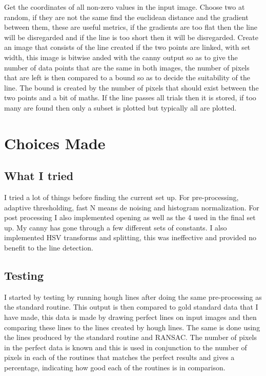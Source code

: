 \documentclass[paper=a4, fontsize=11pt]{scrartcl}
\numberwithin{equation}{section}		%
\numberwithin{figure}{section}			%
\numberwithin{table}{section}				%
\begin{document}
Get the coordinates of all non-zero values in the input image. Choose two at random, if they are not the same find the euclidean distance and the gradient between them, these are useful metrics, if the gradients are too flat then the line will be disregarded and if the line is too short then it will be disregarded. Create an image that consists of the line created if the two points are linked, with set width, this image is bitwise anded with the canny output so as to give the number of data points that are the same in both images, the number of pixels that are left is then compared to a bound so as to decide the suitability of the line. The bound is created by the number of pixels that should exist between the two points and a bit of maths. If the line passes all trials then it is stored, if too many are found then only a subset is plotted but typically all are plotted.

\section{Choices Made}
\subsection{What I tried}

I tried a lot of things before finding the current set up. For pre-processing, adaptive thresholding, fast N means de noising and histogram normalization.  For post processing I also implemented opening as well as the 4 used in the final set up. My canny has gone through a few different sets of constants. I also implemented HSV transforms and splitting, this was ineffective and provided no benefit to the line detection.

\subsection{Testing}

I started by testing by running hough lines after doing the same pre-processing as the standard routine. This output is then compared to gold standard data that I have made, this data is made by drawing perfect lines on input images and then comparing these lines to the lines created by hough lines. The same is done using the lines produced by the standard routine and RANSAC. The number of pixels in the perfect data is known and this is used in conjunction to the number of pixels in each of the routines that matches the perfect results and gives a percentage, indicating how good each of the routines is in comparison.
\end{document}
